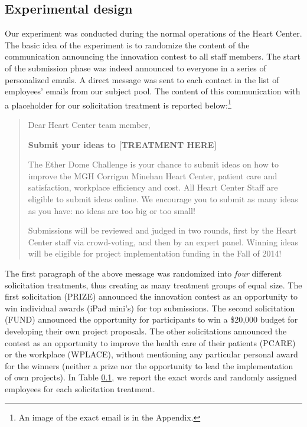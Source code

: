 \documentclass[11pt, titlepage]{article}
\begin{document}
\subsection{Experimental design}\label{experimental-design}

Our experiment was conducted during the normal operations of the Heart
Center. The basic idea of the experiment is to randomize the content of
the communication announcing the innovation contest to all staff
members. The start of the submission phase was indeed announced to
everyone in a series of personalized emails. A direct message was sent
to each contact in the list of employees' emails from our subject pool.
The content of this communication with a placeholder for our
solicitation treatment is reported below:\footnote{An image of the exact
  email is in the Appendix.}

\begin{quote}
Dear Heart Center team member,

\textbf{Submit your ideas to {[}TREATMENT HERE{]}}

The Ether Dome Challenge is your chance to submit ideas on how to
improve the MGH Corrigan Minehan Heart Center, patient care and
satisfaction, workplace efficiency and cost. All Heart Center Staff are
eligible to submit ideas online. We encourage you to submit as many
ideas as you have: no ideas are too big or too small!

Submissions will be reviewed and judged in two rounds, first by the
Heart Center staff via crowd-voting, and then by an expert panel.
Winning ideas will be eligible for project implementation funding in the
Fall of 2014!
\end{quote}

The first paragraph of the above message was randomized into \emph{four}
different solicitation treatments, thus creating as many treatment
groups of equal size. The first solicitation (PRIZE) announced the
innovation contest as an opportunity to win individual awards (iPad
mini's) for top submissions. The second solicitation (FUND) announced
the opportunity for participants to win a \$20,000 budget for developing
their own project proposals. The other solicitations announced the
contest as an opportunity to improve the health care of their patients
(PCARE) or the workplace (WPLACE), without mentioning any particular
personal award for the winners (neither a prize nor the opportunity to
lead the implementation of own projects). In Table
\ref{experimental-design}, we report the exact words and randomly
assigned employees for each solicitation treatment.
\end{document}
